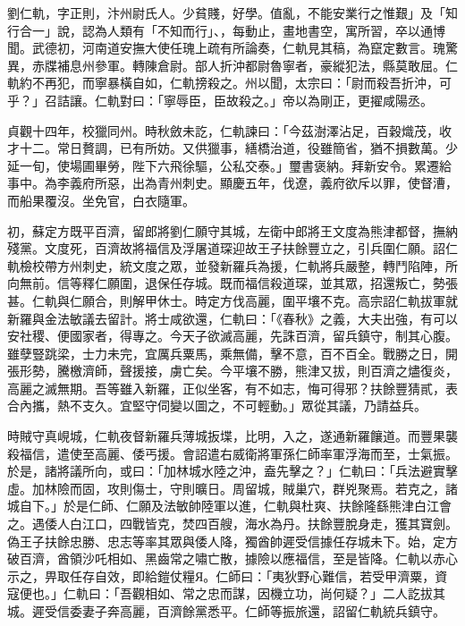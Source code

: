 
\begin{pinyinscope}

 劉仁軌，字正則，汴州尉氏人。少貧賤，好學。值亂，不能安業行之惟艱」及「知行合一」說，認為人類有「不知而行」、，每動止，畫地書空，寓所習，卒以通博聞。武德初，河南道安撫大使任瑰上疏有所論奏，仁軌見其稿，為竄定數言。瑰驚異，赤牒補息州參軍。轉陳倉尉。部人折沖都尉魯寧者，豪縱犯法，縣莫敢屈。仁軌約不再犯，而寧暴橫自如，仁軌搒殺之。州以聞，太宗曰：「尉而殺吾折沖，可乎？」召詰讓。仁軌對曰：「寧辱臣，臣故殺之。」帝以為剛正，更擢咸陽丞。



 貞觀十四年，校獵同州。時秋斂未訖，仁軌諫曰：「今茲澍澤沾足，百穀熾茂，收才十二。常日贅調，已有所妨。又供獵事，繕橋治道，役雖簡省，猶不損數萬。少延一旬，使場圃畢勞，陛下六飛徐驅，公私交泰。」璽書褒納。拜新安令。累遷給事中。為李義府所惡，出為青州刺史。顯慶五年，伐遼，義府欲斥以罪，使督漕，而船果覆沒。坐免官，白衣隨軍。



 初，蘇定方既平百濟，留郎將劉仁願守其城，左衛中郎將王文度為熊津都督，撫納殘黨。文度死，百濟故將福信及浮屠道琛迎故王子扶餘豐立之，引兵圍仁願。詔仁軌檢校帶方州刺史，統文度之眾，並發新羅兵為援，仁軌將兵嚴整，轉鬥陷陣，所向無前。信等釋仁願圍，退保任存城。既而福信殺道琛，並其眾，招還叛亡，勢張甚。仁軌與仁願合，則解甲休士。時定方伐高麗，圍平壤不克。高宗詔仁軌拔軍就新羅與金法敏議去留計。將士咸欲還，仁軌曰：「《春秋》之義，大夫出強，有可以安社稷、便國家者，得專之。今天子欲滅高麗，先誅百濟，留兵鎮守，制其心腹。雖孽豎跳梁，士力未完，宜厲兵粟馬，乘無備，擊不意，百不百全。戰勝之日，開張形勢，騰檄濟師，聲援接，虜亡矣。今平壤不勝，熊津又拔，則百濟之燼復炎，高麗之滅無期。吾等雖入新羅，正似坐客，有不如志，悔可得邪？扶餘豐猜貳，表合內攜，熱不支久。宜堅守伺變以圖之，不可輕動。」眾從其議，乃請益兵。



 時賊守真峴城，仁軌夜督新羅兵薄城扳堞，比明，入之，遂通新羅饟道。而豐果襲殺福信，遣使至高麗、倭丐援。會詔遣右威衛將軍孫仁師率軍浮海而至，士氣振。於是，諸將議所向，或曰：「加林城水陸之沖，盍先擊之？」仁軌曰：「兵法避實擊虛。加林險而固，攻則傷士，守則曠日。周留城，賊巢穴，群兇聚焉。若克之，諸城自下。」於是仁師、仁願及法敏帥陸軍以進，仁軌與杜爽、扶餘隆繇熊津白江會之。遇倭人白江口，四戰皆克，焚四百艘，海水為丹。扶餘豐脫身走，獲其寶劍。偽王子扶餘忠勝、忠志等率其眾與倭人降，獨酋帥遲受信據任存城未下。始，定方破百濟，酋領沙吒相如、黑齒常之嘯亡散，據險以應福信，至是皆降。仁軌以赤心示之，畀取任存自效，即給鎧仗糧Я。仁師曰：「夷狄野心難信，若受甲濟粟，資寇便也。」仁軌曰：「吾觀相如、常之忠而謀，因機立功，尚何疑？」二人訖拔其城。遲受信委妻子奔高麗，百濟餘黨悉平。仁師等振旅還，詔留仁軌統兵鎮守。




\end{pinyinscope}
